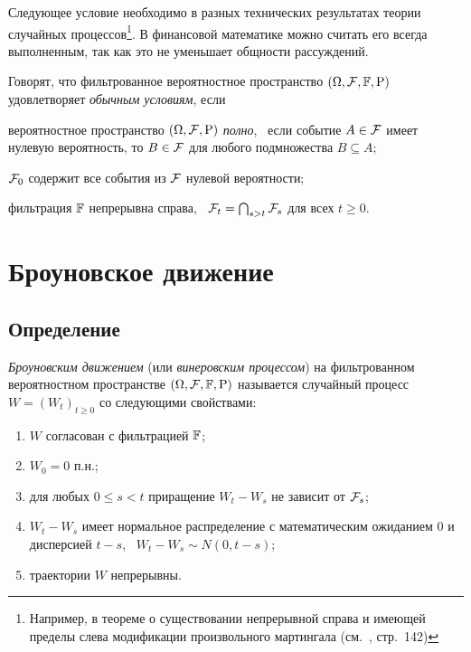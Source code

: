Следующее условие необходимо в разных технических результатах теории случайных процессов\footnote{Например, в теореме о существовании непрерывной справа и имеющей пределы слева модификации произвольного мартингала (см.~\cite{BulinskiShiryaev04}, стр.~142)}.
В финансовой математике можно считать его всегда выполненным, так как это не уменьшает общности рассуждений.

\begin{definition}[$*$]
Говорят, что фильтрованное вероятностное пространство $(\Omega,\mathcal{F},\mathbb{F},\mathrm{P})$ удовлетворяет \emph{обычным условиям}, если
\begin{alphenum}
\item вероятностное пространство $(\Omega,\mathcal{F},\mathrm{P})$ \emph{полно}, \te\ если событие $A\in\mathcal{F}$ имеет нулевую вероятность, то $B\in\mathcal{F}$ для любого подмножества $B\subseteq A$;
\item $\mathcal{F}_0$ содержит все события из $\mathcal{F}$ нулевой вероятности;
\item фильтрация $\mathbb{F}$ непрерывна справа, \te\ $\mathcal{F}_t = \bigcap_{s>t} \mathcal{F}_s$ для всех $t\ge0$.
\end{alphenum}
\end{definition}


\section{Броуновское движение}
\subsection{Определение}

\begin{definition}
\emph{Броуновским движением} (или \emph{винеровским процессом}) на фильтрованном вероятностном пространстве $(\Omega,\mathcal{F},\mathbb{F},\mathrm{P})$ называется случайный процесс $W=(W_t)_{t\ge0}$ со следующими свойствами:
\begin{enumerate}
\item $W$ согласован с фильтрацией $\mathbb{F}$;
\item $W_0=0$ п.н.;
\item для любых $0\le s<t$ приращение $W_t-W_s$ не зависит от $\mathcal{F}_s$;
\item $W_t-W_s$ имеет нормальное распределение с математическим ожиданием 0 и дисперсией $t-s$, \te\ $W_t-W_s\sim N(0,t-s)$;
\item траектории $W$ непрерывны.
\end{enumerate}
\end{definition}

